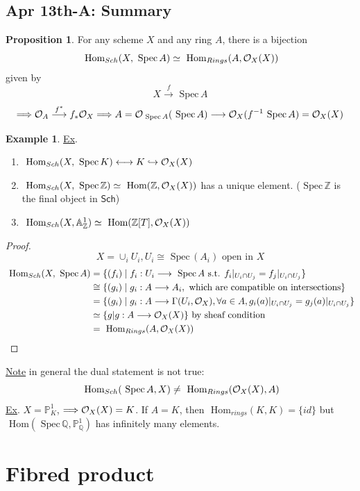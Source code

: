 \documentclass[11pt]{article}
\theoremstyle{definition}
\newtheorem{prop}[thm]{Proposition}
\newtheorem{ex}[thm]{Example}
\renewcommand{\hom}{\text{ Hom}}
\newcommand{\spec}{\text{ Spec}\,}
\newcommand{\affn}{\mathbb A}
\newcommand{\proj}{\mathbb P}
\newcommand{\intg}{\mathbb Z}
\newcommand{\ratl}{\mathbb Q}
\newcommand{\calo}{{\cal O}}
\newcommand{\Lrta}{\Longrightarrow}
\newcommand{\lrta}{\longrightarrow}
\newcommand{\llrta}{\longleftrightarrow}
\newcommand{\inj}{\hookrightarrow}
\begin{document}
\subsection{Apr 13th-A: Summary}

\begin{prop}
For any scheme $X$ and any ring $A$, there is a bijection
$$
\hom_{Sch}(X,\spec A)\simeq \hom_{Rings}(A,\calo_X(X))
$$
given by 
$$
X\overset{f}{\lrta}\spec A
$$
$$
\Lrta \calo_A\overset{f^*}{\lrta} f_*\calo_X\Lrta A=\calo_{\spec A}(\spec A)\lrta \calo_X(f^{-1}\spec A)=\calo_X(X)
$$
\end{prop}
\begin{ex}
\underline{Ex}.\begin{enumerate}[label=(\arabic*)]
\item $\hom_{Sch}(X,\spec K)\llrta K\inj \calo_X(X)$
\item $\hom_{Sch}(X,\spec \intg)\simeq \hom(\intg,\calo_X(X))$ has a unique element. ($\spec \intg$ is the final object in $\mathsf{Sch}$) 
\item $\hom_{Sch}(X,\affn^1_\intg)\simeq\hom(\intg[T],\calo_X(X))$
\end{enumerate}
\end{ex}
\begin{proof}
$$
X=\cup_i U_i, U_i\cong\spec(A_i)\text{ open in } X
$$
$$
\begin{aligned}
\hom_{Sch}(X,\spec A)&=\{(f_i)\mid f_i:U_i\lrta \spec A\text{ s.t. }f_i|_{U_i\cap U_j}=f_j|_{U_i\cap U_j}\}\\
&\cong\{(g_i)\mid g_i:A\lrta A_i,\text{ which are compatible on intersections} \}\\
&=\{(g_i)\mid g_i: A\lrta \Gamma(U_i, \calo_X),\forall a\in A, g_i(a)|_{U_i\cap U_j}=g_j(a)|_{U_i\cap U_j}\}\\
&\simeq\{g|g:A\lrta \calo_X(X)\}\text{ by sheaf condition}\\
&=\hom_{Rings}(A,\calo_X(X))
\end{aligned}
$$
\end{proof}
\underline{Note} in general the dual statement is not true:
$$
\hom_{Sch}(\spec A, X)\neq \hom_{Rings}(\calo_X(X),A)
$$
\underline{Ex}. $X=\proj^1_K$, $\Lrta \calo_X(X)=K$. If $A=K$, then $\hom_{rings}(K,K)=\{id\}$ but 
$\hom(\spec \ratl,\proj^1_\ratl)$ has infinitely many elements.

\section{Fibred product}
\end{document}
